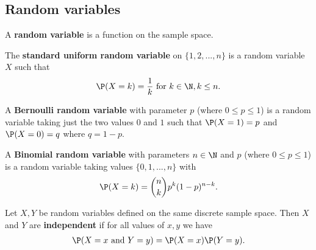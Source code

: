 \documentclass{article}
\begin{document}
\subsection{Random variables}
\begin{definition}
    A \textbf{random variable} is a function on the sample space.
\end{definition}
\begin{definition}
    The \textbf{standard uniform random variable} on $\{1,2,...,n\}$ is a random variable $X$ such that
    \begin{align*}
        \P(X=k)=\frac{1}{k}\text{ for }k\in\N, k\leq n.
    \end{align*}
\end{definition}
\begin{definition}
    A \textbf{Bernoulli random variable} with parameter $p$ (where $0\leq p\leq 1$) is a random variable
    taking just the two values $0$ and $1$ such that $\P(X=1)=p$ and $\P(X=0)=q$ where $q=1-p$.
\end{definition}
\begin{definition}
    A \textbf{Binomial random variable} with parameters $n\in\N$ and $p$ (where $0\leq p\leq 1$) is a
    random variable taking values $\{0,1,...,n\}$ with
    \begin{align*}
        \P(X=k)=\binom{n}{k}p^k(1-p)^{n-k}.
    \end{align*}
\end{definition}
\begin{definition}
    Let $X,Y$ be random variables defined on the same discrete sample space. 
    Then $X$ and $Y$ are \textbf{independent} if for all values of $x,y$ we have
    \begin{align*}
        \P(X=x \text{ and } Y=y) = \P(X=x)\P(Y = y).
    \end{align*}
\end{definition}
\end{document}
